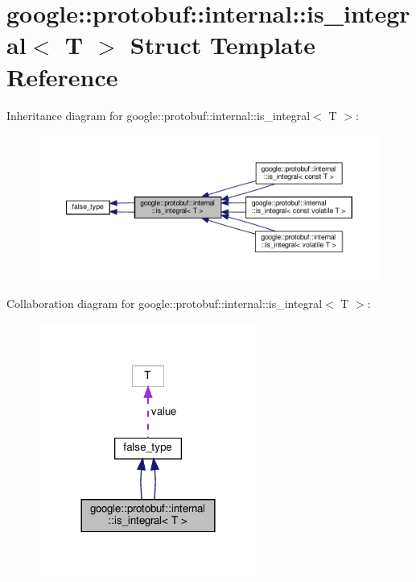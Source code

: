 \hypertarget{structgoogle_1_1protobuf_1_1internal_1_1is__integral}{}\section{google\+:\+:protobuf\+:\+:internal\+:\+:is\+\_\+integral$<$ T $>$ Struct Template Reference}
\label{structgoogle_1_1protobuf_1_1internal_1_1is__integral}


Inheritance diagram for google\+:\+:protobuf\+:\+:internal\+:\+:is\+\_\+integral$<$ T $>$\+:
\nopagebreak
\begin{figure}[H]
\begin{center}
\leavevmode
\includegraphics[width=350pt]{structgoogle_1_1protobuf_1_1internal_1_1is__integral__inherit__graph}
\end{center}
\end{figure}


Collaboration diagram for google\+:\+:protobuf\+:\+:internal\+:\+:is\+\_\+integral$<$ T $>$\+:
\nopagebreak
\begin{figure}[H]
\begin{center}
\leavevmode
\includegraphics[width=204pt]{structgoogle_1_1protobuf_1_1internal_1_1is__integral__coll__graph}
\end{center}
\end{figure}
